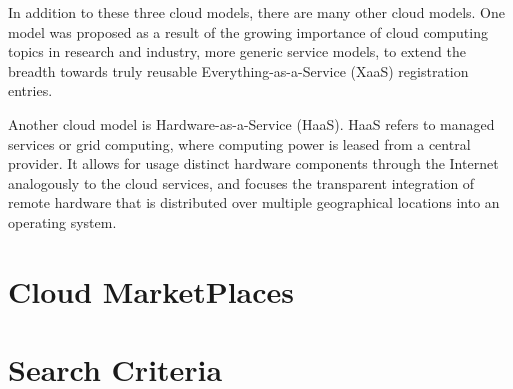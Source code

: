 		In addition to these three cloud models, there are many other cloud models. One model was proposed as a result of the growing importance of cloud computing topics in research and industry, more generic service models, to extend the breadth towards truly reusable Everything-as-a-Service (XaaS) registration entries.\cite{spillner_versatile_2013}
		\par Another cloud model is Hardware-as-a-Service (HaaS). HaaS refers to managed services or grid computing, where computing power is leased from a central provider\cite{what_is_haas}. It allows for usage distinct hardware components through the Internet analogously to the cloud services, and focuses the transparent integration of remote hardware that is distributed over multiple geographical locations into an operating system\cite{stanik_hardware_2012}.


\section {Cloud MarketPlaces}
\section {Search Criteria}